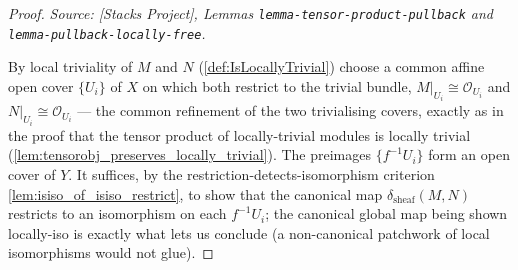 \begin{proof}
  \textit{Source: [Stacks Project], Lemmas \texttt{lemma-tensor-product-pullback} and
  \texttt{lemma-pullback-locally-free}.}

  By local triviality of \(M\) and \(N\) (\cref{def:IsLocallyTrivial}) choose a common
  affine open cover \(\{U_i\}\) of \(X\) on which both restrict to the trivial bundle,
  \(M|_{U_i} \cong \mathcal{O}_{U_i}\) and \(N|_{U_i} \cong \mathcal{O}_{U_i}\) --- the
  common refinement of the two trivialising covers, exactly as in the proof that the
  tensor product of locally-trivial modules is locally trivial
  (\cref{lem:tensorobj_preserves_locally_trivial}). The preimages
  \(\{f^{-1}U_i\}\) form an open cover of \(Y\). It suffices, by the
  restriction-detects-isomorphism criterion \cref{lem:isiso_of_isiso_restrict}, to show
  that the canonical map \(\delta_{\mathrm{sheaf}}(M,N)\) restricts to an isomorphism on
  each \(f^{-1}U_i\); the canonical global map being shown locally-iso is exactly what
  lets us conclude (a non-canonical patchwork of local isomorphisms would not glue).


\end{proof}
